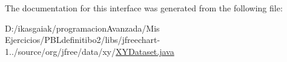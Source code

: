 The documentation for this interface was generated from the following file\+:\begin{DoxyCompactItemize}
\item 
D\+:/ikasgaiak/programacion\+Avanzada/\+Mis Ejercicios/\+P\+B\+Ldefinitibo2/libs/jfreechart-\/1../source/org/jfree/data/xy/\mbox{\hyperlink{_x_y_dataset_8java}{X\+Y\+Dataset.\+java}}\end{DoxyCompactItemize}
